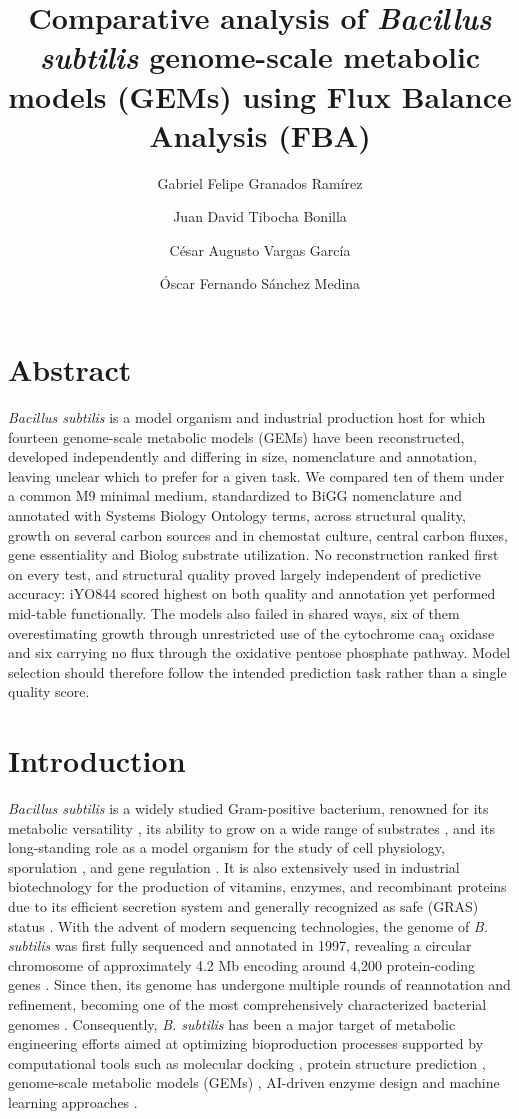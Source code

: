 \documentclass[11pt, a4paper]{article}
\title{\Large \textbf{Comparative analysis of \textit{Bacillus subtilis} genome-scale metabolic models (GEMs) using Flux Balance Analysis (FBA)}}
\author[1]{Gabriel Felipe Granados Ramírez}
\author[2]{Juan David Tibocha Bonilla}
\author[3]{César Augusto Vargas García}
\author[4]{Óscar Fernando Sánchez Medina}
\affil[1]{Pontificia Universidad Javeriana, Faculty of Science, Bogotá, Colombia}
\affil[2]{Lawrence Berkeley National Laboratory, Berkeley, California}
\affil[3]{AGROSAVIA, Corporación Colombiana de Investigación Agropecuaria, Mosquera, Colombia}
\affil[4]{Pontificia Universidad Javeriana, Faculty of Engineering, Bogotá, Colombia}
\date{}
\begin{document}
\maketitle

\section{Abstract}

\textit{Bacillus subtilis} is a model organism and industrial production host for which fourteen genome-scale metabolic models (GEMs) have been reconstructed, developed independently and differing in size, nomenclature and annotation, leaving unclear which to prefer for a given task. We compared ten of them under a common M9 minimal medium, standardized to BiGG nomenclature and annotated with Systems Biology Ontology terms, across structural quality, growth on several carbon sources and in chemostat culture, central carbon fluxes, gene essentiality and Biolog substrate utilization. No reconstruction ranked first on every test, and structural quality proved largely independent of predictive accuracy: iYO844 scored highest on both quality and annotation yet performed mid-table functionally. The models also failed in shared ways, six of them overestimating growth through unrestricted use of the cytochrome caa$_3$ oxidase and six carrying no flux through the oxidative pentose phosphate pathway. Model selection should therefore follow the intended prediction task rather than a single quality score.

\section{Introduction}
\textit{Bacillus subtilis} is a widely studied Gram-positive bacterium, renowned for its metabolic versatility \parencite{su-2020}, its ability to grow on a wide range of substrates \parencite{mageshwaran-2014}, and its long-standing role as a model organism for the study of cell physiology, sporulation \parencite{tibocha-bonilla-2025}, and gene regulation \parencite{goelzer-2008}. It is also extensively used in industrial biotechnology for the production of vitamins, enzymes, and recombinant proteins due to its efficient secretion system \parencite{liu-2025} and generally recognized as safe (GRAS) status \parencite{akinsemolu-2024}. With the advent of modern sequencing technologies, the genome of \textit{B. subtilis} was first fully sequenced and annotated in 1997, revealing a circular chromosome of approximately 4.2 Mb encoding around 4,200 protein-coding genes \parencite{kunst-1997}. Since then, its genome has undergone multiple rounds of reannotation and refinement, becoming one of the most comprehensively characterized bacterial genomes \parencite{errington-2020}. Consequently, \textit{B. subtilis} has been a major target of metabolic engineering efforts aimed at optimizing bioproduction processes supported by computational tools such as molecular docking \parencite{golchha-2025}, protein structure prediction \parencite{mahendran-2024}, genome-scale metabolic models (GEMs) \parencite{liu-2025}, AI-driven enzyme design \parencite{wu-2026} and machine learning approaches \parencite{albornoz-2024}.
\end{document}

